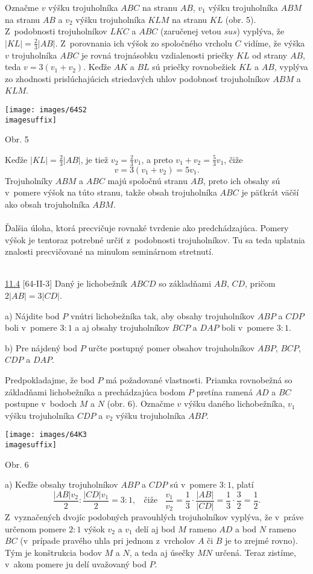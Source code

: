 \rieh Označme $v$ výšku trojuholníka $ABC$ na stranu $AB$, $v_1$ výšku trojuholníka $ABM$ na stranu $AB$ a $v_2$ výšku trojuholníka $KLM$ na stranu $KL$ (obr. 5). Z~podobnosti trojuholníkov $LKC$ a $ABC$ (zaručenej vetou $sus$) vyplýva, že $|KL| =\frac{2}{3} |AB|$. Z~porovnania ich výšok zo spoločného vrcholu $C$ vidíme, že výška $v$ trojuholníka $ABC$ je rovná trojnásobku vzdialenosti priečky $KL$ od strany $AB$, teda $v = 3(v_1 +v_2)$. Keďže $AK$ a $BL$ sú priečky rovnobežiek $KL$ a $AB$, vyplýva zo zhodnosti prislúchajúcich striedavých uhlov podobnosť trojuholníkov $ABM$ a $KLM$.
\begin{center}
\texttt{[image: images/64S2\\imagesuffix]}

Obr. 5
\end{center}
Keďže $|KL| =\frac{2}{3}|AB|$, je tiež $v_2 =\frac{2}{3}v_1$, a preto $v_1 + v_2 =\frac{5}{3}v_1$, čiže
$$v = 3(v_1 + v_2) = 5v_1.$$
Trojuholníky $ABM$ a $ABC$ majú spoločnú stranu $AB$, preto ich obsahy sú v~pomere výšok na túto stranu, takže obsah trojuholníka $ABC$ je päťkrát väčší ako obsah trojuholníka $ABM$.\\
\\
\kom Ďalšia úloha, ktorá precvičuje rovnaké tvrdenie ako predchádzajúca. Pomery výšok je tentoraz potrebné určiť z~podobnosti trojuholníkov. Tu sa teda uplatnia znalosti precvičované na minulom seminárnom stretnutí. \\
\\
\begin{tcolorbox}[breakable,notitle,boxrule=0pt,colback=light-gray,colframe=light-gray]\ul{11.4} [64-II-3]  Daný je lichobežník $ABCD$ so základňami $AB$, $CD$, pričom $2|AB| = 3|CD|$.

a) Nájdite bod $P$ vnútri lichobežníka tak, aby obsahy trojuholníkov $ABP$ a $CDP$ boli v~pomere $3 : 1$ a aj obsahy trojuholníkov $BCP$ a $DAP$ boli v~pomere $3 : 1$.

b) Pre nájdený bod $P$ určte postupný pomer obsahov trojuholníkov $ABP$, $BCP$, $CDP$ a $DAP$.

\end{tcolorbox}

\rieh Predpokladajme, že bod $P$ má požadované vlastnosti. Priamka rovnobežná so základňami lichobežníka a prechádzajúca bodom $P$ pretína ramená $AD$ a $BC$ postupne v~bodoch $M$ a $N$ (obr. 6). Označme $v$ výšku daného lichobežníka, $v_1$ výšku trojuholníka $CDP$ a $v_2$ výšku trojuholníka $ABP$.
\begin{center}
\texttt{[image: images/64K3\\imagesuffix]}

Obr. 6
\end{center}
a) Keďže obsahy trojuholníkov $ABP$ a $CDP$ sú v~pomere $3 : 1$, platí
$$\frac{|AB|v_2}{2}:\frac{|CD|v_1}{2}= 3 : 1, \ \ \ \ \text{čiže} \ \ \ \ \frac{v_1}{v_2}=\frac{1}{3}\cdot \frac{|AB|}{|CD|}=\frac{1}{3}\cdot \frac{3}{2}=\frac{1}{2}.$$
Z~vyznačených dvojíc podobných pravouhlých trojuholníkov vyplýva, že v~práve určenom pomere $2 : 1$ výšok $v_2$ a $v_1$ delí aj bod $M$ rameno $AD$ a bod $N$ rameno $BC$ (v~prípade pravého uhla pri jednom z~vrcholov $A$ či $B$ je to zrejmé rovno). Tým je konštrukcia bodov $M$ a $N$, a teda aj úsečky $MN$ určená. Teraz zistíme, v~akom pomere ju delí uvažovaný bod $P$.

